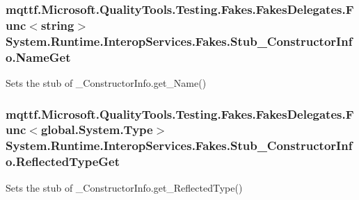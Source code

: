 \hypertarget{class_system_1_1_runtime_1_1_interop_services_1_1_fakes_1_1_stub___constructor_info_a2e795704fcbef1037b6f03f0c2ed5723}{
\subsubsection[{Name\-Get}]{\setlength{\rightskip}{0pt plus 5cm}mqttf.\-Microsoft.\-Quality\-Tools.\-Testing.\-Fakes.\-Fakes\-Delegates.\-Func$<$string$>$ System.\-Runtime.\-Interop\-Services.\-Fakes.\-Stub\-\_\-\-Constructor\-Info.\-Name\-Get}}\label{class_system_1_1_runtime_1_1_interop_services_1_1_fakes_1_1_stub___constructor_info_a2e795704fcbef1037b6f03f0c2ed5723}


Sets the stub of \-\_\-\-Constructor\-Info.\-get\-\_\-\-Name()

\hypertarget{class_system_1_1_runtime_1_1_interop_services_1_1_fakes_1_1_stub___constructor_info_a95d951d930c5b1547126e37b8bc33ced}{
\subsubsection[{Reflected\-Type\-Get}]{\setlength{\rightskip}{0pt plus 5cm}mqttf.\-Microsoft.\-Quality\-Tools.\-Testing.\-Fakes.\-Fakes\-Delegates.\-Func$<$global.\-System.\-Type$>$ System.\-Runtime.\-Interop\-Services.\-Fakes.\-Stub\-\_\-\-Constructor\-Info.\-Reflected\-Type\-Get}}\label{class_system_1_1_runtime_1_1_interop_services_1_1_fakes_1_1_stub___constructor_info_a95d951d930c5b1547126e37b8bc33ced}


Sets the stub of \-\_\-\-Constructor\-Info.\-get\-\_\-\-Reflected\-Type()


